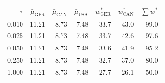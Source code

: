 \begin{tabular}{rrrrrrr}
\toprule
$\tau$ & $\bar\mu_{\mathrm{GER}}$ & $\bar\mu_{\mathrm{CAN}}$ & $\bar\mu_{\mathrm{USA}}$ & $w^*_{\mathrm{GER}}$ & $w^*_{\mathrm{CAN}}$ & $\sum w^*$ \\
\midrule
0.010 & 11.21 & 8.73 & 7.48 & 33.7 & 43.0 & 99.0 \\
0.025 & 11.21 & 8.73 & 7.48 & 33.7 & 42.6 & 97.6 \\
0.050 & 11.21 & 8.73 & 7.48 & 33.6 & 41.9 & 95.2 \\
0.250 & 11.21 & 8.73 & 7.48 & 32.7 & 37.0 & 80.0 \\
1.000 & 11.21 & 8.73 & 7.48 & 27.7 & 26.1 & 50.0 \\
\bottomrule
\end{tabular}
